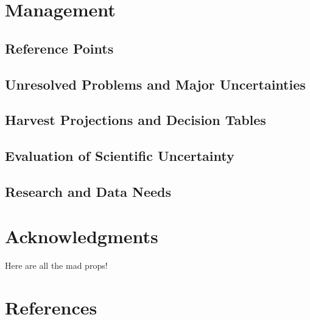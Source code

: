 \documentclass[11pt,
  english,
  letterpaper,
]{article}
\begin{document}
\hypertarget{management}{%
\section{Management}\label{management}}

\hypertarget{reference-points-2}{%
\subsection{Reference Points}\label{reference-points-2}}

\hypertarget{unresolved-problems-and-major-uncertainties-2}{%
\subsection{Unresolved Problems and Major Uncertainties}\label{unresolved-problems-and-major-uncertainties-2}}

\hypertarget{harvest-projections-and-decision-tables}{%
\subsection{Harvest Projections and Decision Tables}\label{harvest-projections-and-decision-tables}}

\hypertarget{evaluation-of-scientific-uncertainty}{%
\subsection{Evaluation of Scientific Uncertainty}\label{evaluation-of-scientific-uncertainty}}

\hypertarget{research-and-data-needs-1}{%
\subsection{Research and Data Needs}\label{research-and-data-needs-1}}

\hypertarget{acknowledgments}{%
\section{Acknowledgments}\label{acknowledgments}}

Here are all the mad props!

\clearpage

\hypertarget{references}{%
\section{References}\label{references}}
\end{document}
